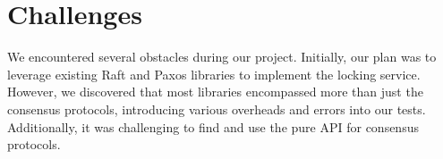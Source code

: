 \documentclass[11pt,a4paper]{article}
\begin{document}



\section{Challenges}\label{sec5}
We encountered several obstacles during our project. Initially, our plan was to leverage existing Raft and Paxos libraries to implement the locking service. However, we discovered that most libraries encompassed more than just the consensus protocols, introducing various overheads and errors into our tests. Additionally, it was challenging to find and use the pure API for consensus protocols.
\end{document}

